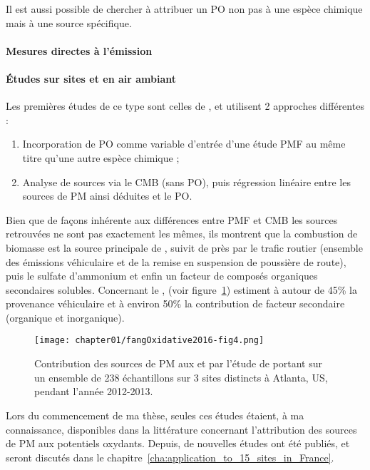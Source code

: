 Il est aussi possible de chercher à attribuer un PO non pas à une espèce chimique mais à
une source spécifique.
\paragraph{Mesures directes à l'émission}%
\label{par:mesures_directes_à_l_émission}

\paragraph{Études sur sites et en air ambiant}%
\label{par:études_sur_sites_et_en_air_ambiant}

Les premières études de ce type sont celles de
\textcite{vermaReactive2014,batesReactive2015,fangOxidative2016}, et utilisent 2 approches
différentes :
\begin{enumerate}
    \item Incorporation de PO comme variable d'entrée d'une étude PMF au même titre qu'une
        autre espèce chimique ;
    \item Analyse de sources via le CMB (sans PO), puis régression linéaire entre les
        sources de PM ainsi déduites et le PO.
\end{enumerate}
Bien que de façons inhérente aux différences entre PMF et CMB les sources retrouvées ne
sont pas exactement les mêmes, ils montrent que la combustion de biomasse est la source
principale de \PODTTv, suivit de près par le trafic routier (ensemble des émissions
véhiculaire et de la remise en suspension de poussière de route), puis le sulfate
d'ammonium et enfin un facteur de composés organiques secondaires solubles.
Concernant le \POAAv, \textcite{fangOxidative2016} (voir
figure~\ref{fig:chapter01/fangOxidative2016-fig4}) estiment à autour de 45\% la
provenance véhiculaire et à environ 50\% la contribution de facteur secondaire (organique
et inorganique).

\begin{figure}[ht]
    \centering
    \texttt{[image: chapter01/fangOxidative2016-fig4.png]}
    \caption{Contribution des sources de PM aux \POAAv{} et \PODTTv{} par l'étude de
    \textcite{fangOxidative2016} portant sur un ensemble de 238 échantillons sur 3 sites
        distincts à Atlanta, US, pendant l'année 2012-2013.}%
    \label{fig:chapter01/fangOxidative2016-fig4}
\end{figure}

Lors du commencement de ma thèse, seules ces études étaient, à ma connaissance,
disponibles dans la littérature concernant l'attribution des sources de PM aux potentiels
oxydants.  Depuis, de nouvelles études ont été publiés, et seront discutés dans le
chapitre~\ref{cha:application_to_15_sites_in_France}.


